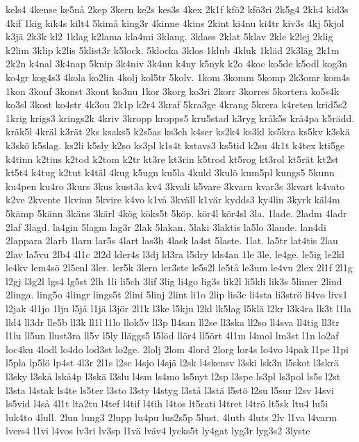 {kels4
4kense
ke5nå
2kep
3kern
ke2s
kes3s
4kex
2k1f
kfö2
kfö3ri
2k5g4
2kh4
kid3s
4kif
1kig
kik4s
kilt4
5kimå
king3r
4kinne
4kins
2kint
ki4nu
ki4tr
kiv3s
4kj
5kjol
k3jä
2k3k
kl2
1klag
k2lama
kla4mi
3klang.
3klass
2klat
5klav
2kle
k2lej
2klig
k2lim
3klip
k2lis
5klist3r
k5lock.
5klocka
3klos
1klub
4kluk
1kläd
2k3läg
2k1m
2k2n
k4nal
3k4nap
5knip
3k4niv
3k4nu
k4ny
k5nyk
k2o
4koc
ko5de
k5odl
kog3n
ko4gr
kog4s3
4kola
ko2lin
4kolj
kol5tr
5kolv.
1kom
3komm
5komp
2k3omr
kom4s
1kon
3konf
3konst
3kont
ko3nu
1kor
3korg
ko3ri
2korr
3korres
5kortera
ko5s4k
ko3sl
3kost
ko4str
4k3ou
2k1p
k2r4
3kraf
5kra3ge
4krang
5krera
k4reten
krid5s2
1krig
krigs3
krings2k
4kriv
3kropp
kropps5
kru5stad
k3ryg
kråk5s
krå4pa
k5rädd.
kräk5l
4kräl
k3rät
2ks
ksaks5
k2s5as
ks3ch
k4ser
ks2k4
ks3kl
ks5kra
ks5kv
k3skä
k3skö
k5slag.
ks2li
k5sly
k2so
ks3pl
k1s4t
kstavs3
ks5tid
k2su
4k1t
k4tex
kti5ge
k4tinn
k2tins
k2tod
k2tom
k2tr
kt3re
kt3rin
k5trod
kt5rog
kt3rol
kt5rät
kt2st
kt5t4
k4tug
k2tut
k4täl
4kug
k5ugn
ku5la
4kuld
3kulö
kum5pl
kungs5
5kunn
ku4pen
ku4ro
3kurs
3kus
kust3a
kv4
3kvali
k5vare
3kvarn
kvar3s
3kvart
k4vato
k2ve
2kvente
1kvinn
5kvire
k4vo
k1vå
3kväll
k1vär
kydds3
ky4lin
3kyrk
käl4m
5kämp
5känn
3käns
3kärl
4kög
köks5t
5köp.
kör4l
kör4sl
3la.
1lade.
2ladm
4ladr
2laf
3lagd.
la4gin
5lagm
lag3r
2lak
5lakan.
5laki
3laktis
la5lo
3lande.
lan4di
2lappara
2larb
1larn
lar5s
4lart
las3h
4lask
la4st
5laste.
1lat.
la5tr
lat4tis
2lau
2lav
la5vu
2lb4
4l1c
2l2d
lder4s
l3dj
ld3ra
l5dry
lds4an
1le
3le.
le4ge.
le5ig
le2kl
le4kv
lem4sö
2l5enl
3ler.
ler5k
3lern
ler3ste
le5s2l
le5tå
le3um
le4vu
2lex
2l1f
2l1g
l2gj
l3g2l
lgs4
lg5st
2lh
1li
li5ch
3lif
3lig
li4go
lig3s
lik2l
li5kli
lik3s
5limer
2lind
2linga.
ling5o
4lingr
lings5t
2lini
5linj
2lint
li1o
2lip
lis3c
li4sta
li3strö
li4vo
livs1
l2jak
4l1jo
1lju
l5jå
l1jä
l3jör
2l1k
l3ke
l5kju
l2kl
lk5lag
l5klä
l2kr
l3k4ra
lk3t
l1la
lld4
ll3dr
lle5b
ll3k
ll1l
l1lo
llok5v
ll3p
ll4san
ll2se
ll3ska
ll2so
ll4sva
ll4tig
ll3tr
l1lu
ll5un
llust3ra
ll5v
l5ly
lläggs5
l5löd
llör4
ll5ört
4l1m
l4mol
lm3st
l1n
lo2af
loc4ku
4lodl
lo4do
lod3st
lo2ge.
2lolj
2lom
4lord
2lorg
lor4s
lo4vo
l4pak
l1pe
l1pi
l5pla
lp5lö
lp4st
4l3r
2l1s
l2sc
l4sjo
l4sjä
l2sk
l4skensv
l3ski
lsk3n
l5skot
l3skrä
l3sky
l3skå
lskå4p
l3skä
l3slu
l4sm
ls4mo
ls5nyt
l2sp
l3spe
ls3pl
ls3pol
ls5s
l2st
l3sta
l4stak
ls4te
ls5ter
l3sto
l3sty
l4styg
l3stå
l3stä
l5stö
l2su
l5sur
l2sv
l4svi
ls5vid
l4så
4l1t
lta2tu
l4tef
l4tif
l4tih
l4tos
lt5rati
l4tret
l4trö
lt5sk
ltu4
lu5i
luk4to
4lull.
2lun
lung3
2lupp
lu4pu
lus2s5p
5lust.
4lutb
4luts
2lv
l1va
l4varm
lvers4
l1vi
l4vos
lv3ri
lv3sp
l1vä
lväv4
lycks5t
ly4gat
lyg3r
lyg3s2
3lyste
}
